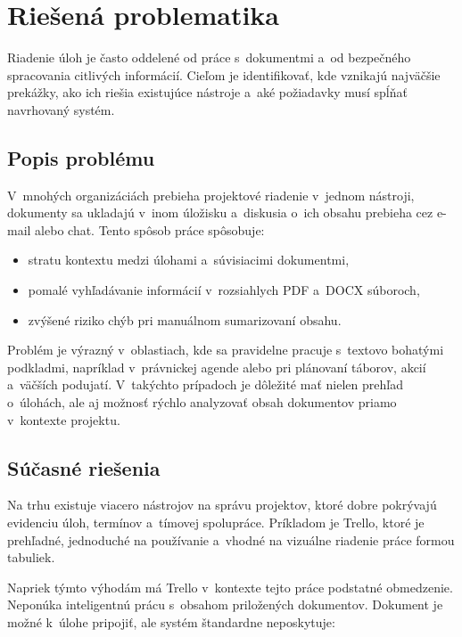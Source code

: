 \chapter{Riešená problematika}

Riadenie úloh je často oddelené od práce s~dokumentmi a~od bezpečného spracovania
citlivých informácií. Cieľom je identifikovať, kde vznikajú najväčšie prekážky, ako
ich riešia existujúce nástroje a~aké požiadavky musí spĺňať navrhovaný systém.

\section{Popis problému}

        V~mnohých organizáciách prebieha projektové riadenie v~jednom nástroji, dokumenty
sa ukladajú v~inom úložisku a~diskusia o~ich obsahu prebieha cez e-mail alebo chat.
Tento spôsob práce spôsobuje:

\begin{itemize}
  \item stratu kontextu medzi úlohami a~súvisiacimi dokumentmi,
  \item pomalé vyhľadávanie informácií v~rozsiahlych PDF a~DOCX súboroch,
  \item zvýšené riziko chýb pri manuálnom sumarizovaní obsahu.
\end{itemize}

        Problém je výrazný v~oblastiach, kde sa pravidelne pracuje s~textovo bohatými
podkladmi, napríklad v~právnickej agende alebo pri plánovaní táborov, akcií a~väčších
podujatí. V~takýchto prípadoch je dôležité mať nielen prehľad o~úlohách, ale aj možnosť
rýchlo analyzovať obsah dokumentov priamo v~kontexte projektu.

\section{Súčasné riešenia}

        Na trhu existuje viacero nástrojov na správu projektov, ktoré dobre pokrývajú
evidenciu úloh, termínov a~tímovej spolupráce. Príkladom je Trello, ktoré je prehľadné,
jednoduché na používanie a~vhodné na vizuálne riadenie práce formou tabuliek.

        Napriek týmto výhodám má Trello v~kontexte tejto práce podstatné obmedzenie.
Neponúka inteligentnú prácu s~obsahom priložených dokumentov. Dokument je možné k~úlohe
pripojiť, ale systém štandardne neposkytuje:

